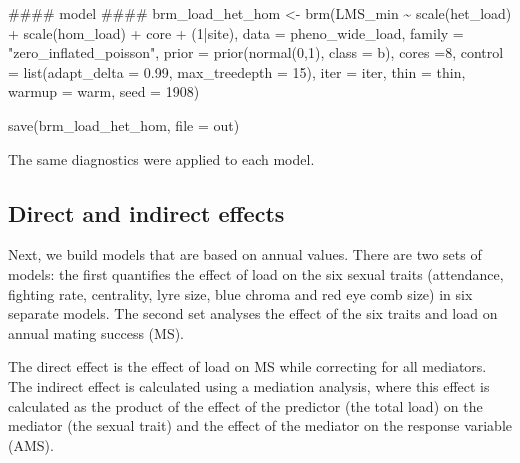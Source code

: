 \documentclass[
  letterpaper,
  DIV=11,
  numbers=noendperiod]{scrreprt}
\newenvironment{Shaded}{}{}
\newcommand{\AttributeTok}[1]{\textcolor[rgb]{0.84,0.23,0.29}{#1}}
\newcommand{\DecValTok}[1]{\textcolor[rgb]{0.00,0.36,0.77}{#1}}
\newcommand{\DocumentationTok}[1]{\textcolor[rgb]{0.42,0.45,0.49}{#1}}
\newcommand{\FloatTok}[1]{\textcolor[rgb]{0.00,0.36,0.77}{#1}}
\newcommand{\FunctionTok}[1]{\textcolor[rgb]{0.44,0.26,0.76}{#1}}
\newcommand{\NormalTok}[1]{\textcolor[rgb]{0.14,0.16,0.18}{#1}}
\newcommand{\OtherTok}[1]{\textcolor[rgb]{0.44,0.26,0.76}{#1}}
\newcommand{\SpecialCharTok}[1]{\textcolor[rgb]{0.00,0.36,0.77}{#1}}
\newcommand{\StringTok}[1]{\textcolor[rgb]{0.01,0.18,0.38}{#1}}
\begin{document}
\begin{Shaded}
\begin{Highlighting}[]
\DocumentationTok{\#\#\#\# model \#\#\#\#}
\NormalTok{brm\_load\_het\_hom }\OtherTok{\textless{}{-}} \FunctionTok{brm}\NormalTok{(LMS\_min }\SpecialCharTok{\textasciitilde{}} \FunctionTok{scale}\NormalTok{(het\_load) }\SpecialCharTok{+} \FunctionTok{scale}\NormalTok{(hom\_load) }\SpecialCharTok{+}\NormalTok{ core }\SpecialCharTok{+}\NormalTok{ (}\DecValTok{1}\SpecialCharTok{|}\NormalTok{site), }\AttributeTok{data =}\NormalTok{ pheno\_wide\_load,}
                  \AttributeTok{family =} \StringTok{"zero\_inflated\_poisson"}\NormalTok{,}
                  \AttributeTok{prior =} \FunctionTok{prior}\NormalTok{(}\FunctionTok{normal}\NormalTok{(}\DecValTok{0}\NormalTok{,}\DecValTok{1}\NormalTok{), }\AttributeTok{class =}\NormalTok{ b),}
                  \AttributeTok{cores =}\DecValTok{8}\NormalTok{, }\AttributeTok{control =} \FunctionTok{list}\NormalTok{(}\AttributeTok{adapt\_delta =} \FloatTok{0.99}\NormalTok{, }\AttributeTok{max\_treedepth =} \DecValTok{15}\NormalTok{),}
                  \AttributeTok{iter =}\NormalTok{ iter, }\AttributeTok{thin =}\NormalTok{ thin, }\AttributeTok{warmup =}\NormalTok{ warm, }\AttributeTok{seed =} \DecValTok{1908}\NormalTok{)}

\FunctionTok{save}\NormalTok{(brm\_load\_het\_hom, }\AttributeTok{file =}\NormalTok{ out)}
\end{Highlighting}
\end{Shaded}

The same diagnostics were applied to each model.

\hypertarget{direct-and-indirect-effects}{%
\subsection{Direct and indirect
effects}\label{direct-and-indirect-effects}}

Next, we build models that are based on annual values. There are two
sets of models: the first quantifies the effect of load on the six
sexual traits (attendance, fighting rate, centrality, lyre size, blue
chroma and red eye comb size) in six separate models. The second set
analyses the effect of the six traits and load on annual mating success
(MS).

The direct effect is the effect of load on MS while correcting for all
mediators. The indirect effect is calculated using a mediation analysis,
where this effect is calculated as the product of the effect of the
predictor (the total load) on the mediator (the sexual trait) and the
effect of the mediator on the response variable (AMS).
\end{document}
